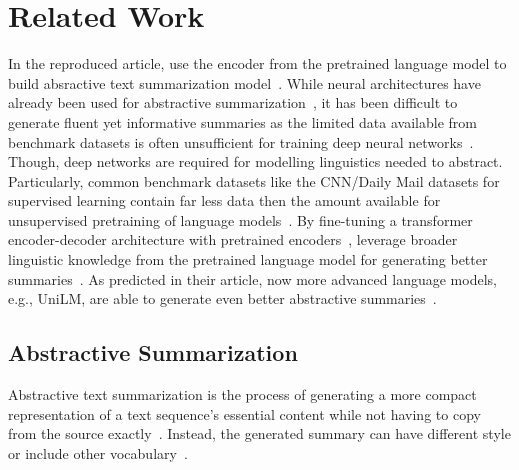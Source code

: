 \section{Related Work} %

In the reproduced article, \citeauthor{LiuL2019} use the encoder from the pretrained \Bert language model to build absractive text summarization model~\cite{LiuL2019,DevlinCLT2019}.
While neural architectures have already been used for abstractive summarization~\cite{NallapatiZSGX2016,SeeLM2017,PaulusXS2018}, it has been difficult to generate fluent yet informative summaries as the limited data available from benchmark datasets is often unsufficient for training deep neural networks~\cite{NallapatiZSGX2016}. Though, deep networks are required for modelling linguistics needed to abstract.
Particularly, common benchmark datasets like the CNN/Daily Mail datasets for supervised learning contain far less data then the amount available for unsupervised pretraining of language models~\cite{HermannKGEKSB2015,DevlinCLT2019}.
By fine-tuning a transformer encoder-decoder architecture with pretrained encoders~\cite{VaswaniSPUJGKP2017,DevlinCLT2019}, \citeauthor{LiuL2019} leverage broader linguistic knowledge from the pretrained language model for generating better summaries~\cite{LiuL2019}.
As predicted in their article, now more advanced language models, e.g., UniLM, are able to generate even better abstractive summaries~\cite{DongWWLWGZH2019,LiuL2019}.

\subsection{Abstractive Summarization}

Abstractive text summarization is the process of generating a more compact representation of a text sequence's essential content while not having to copy from the source exactly~\cite[28]{Torres-Moreno2014}. Instead, the generated summary can have different style or include other vocabulary~\cite{NallapatiZSGX2016}.


